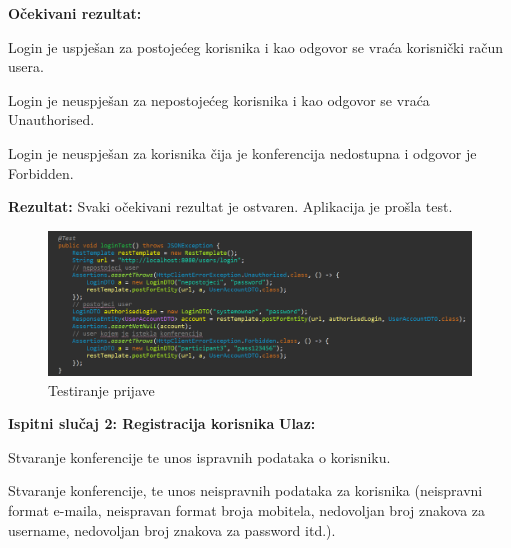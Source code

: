    \textbf{Očekivani rezultat:}
   \begin{packed_item}
   \item[] \begin{packed_enum}
				
				\item Login je uspješan za postojećeg korisnika i kao odgovor se vraća korisnički račun usera.
    \item Login je neuspješan za nepostojećeg korisnika i kao odgovor se vraća Unauthorised.
    \item Login je neuspješan za korisnika čija je konferencija nedostupna i odgovor je Forbidden.
				
			\end{packed_enum}
   \end{packed_item}
   \textbf{Rezultat:} \text Svaki očekivani rezultat je ostvaren. \color{red} Aplikacija je prošla test. \color{black}

    \begin{figure}[H]
            \includegraphics[scale=0.55]{slike/login.png} %
			
			\centering
			\caption{Testiranje prijave}
			\label{fig:testiranje prijave}
			\end{figure}






   \textbf{\newline Ispitni slučaj 2: Registracija korisnika\newline  }
   \textbf{Ulaz:}
   \begin{packed_item}
   \item[] \begin{packed_enum}
				
				\item Stvaranje konferencije te unos ispravnih podataka o korisniku.
    \item Stvaranje konferencije, te unos neispravnih podataka za korisnika (neispravni format e-maila, neispravan format broja mobitela, nedovoljan broj znakova za username, nedovoljan broj znakova za password itd.).
				
			\end{packed_enum}
   \end{packed_item}

